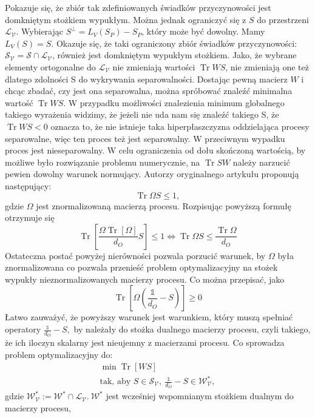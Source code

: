 \documentclass[10pt]{article} %
\DeclareMathOperator{\Trs}{Tr}
\newcommand{\I}{\mathbb{1}}
\begin{document}
Pokazuje się, że zbiór tak zdefiniowanych świadków przyczynowości jest domkniętym stożkiem wypukłym. Można jednak ograniczyć się z $S$ do przestrzeni 
$\mathcal{L_V}$. Wybierając $S^\bot = L_V(S_P) - S_P$, który może być dowolny. Mamy $L_V(S) = S$. Okazuje się, że taki ograniczony zbiór świadków przyczynowości: $\mathcal{S_V} = \mathcal{S} \cap \mathcal{L_V}$, również jest domkniętym wypukłym stożkiem. Jako, że wybrane elementy ortogonalne do
$\mathcal{L_V}$ nie zmieniają wartości $\Trs WS$, nie zmieniają one też dlatego zdolności S do wykrywania separowalności. 
Dostając pewną macierz $W$ i chcąc zbadać, czy jest ona separowalna, można spróbować znaleźć minimalna wartość $\Trs WS$. W przypadku możliwości 
znalezienia minimum globalnego takiego wyrażenia widzimy, że jeżeli nie uda nam się znaleźć takiego S, że $\Trs WS < 0$ oznacza to, że nie istnieje
taka hiperpłaszczyzna oddzielająca procesy separowalne, więc ten proces też jest separowalny. W przeciwnym wypadku proces jest nieseparowalny.
W celu ograniczenia od dołu skończoną wartością, by możliwe było rozwiązanie problemu numerycznie, na $\Trs SW$ należy narzucić pewien dowolny warunek normujący.
Autorzy oryginalnego artykułu proponują następujący:
\begin{equation}
\Trs \Omega S \leq 1,
\end{equation}
gdzie $\Omega$ jest znormalizowaną macierzą procesu.
Rozpisując powyższą formułę otrzymuje się
\begin{equation}
\Trs\left[ \frac{\Omega \Trs \left[ \Omega \right]}{d_O}S\right]\leq1 \iff \Trs \Omega S \leq \frac{\Trs \Omega}{d_O}
\end{equation}
Ostateczna postać powyżej nierówności pozwala porzucić warunek, by $\Omega$ była znormalizowana co pozwala przenieść problem optymalizacyjny na stożek wypukły nieznormalizowanych macierzy procesu.
Co można przepisać, jako 
\begin{equation}
\Trs \left[ \Omega(\frac{\I}{d_O} -S) \right] \geq 0
\end{equation}
Łatwo zauważyć, że powyższy warunek jest warunkiem, który muszą spełniać operatory $\frac{\I}{d_O} - S,$ by należały do stożka dualnego macierzy procesu, czyli takiego, że ich iloczyn skalarny jest nieujemny z macierzami procesu. Co sprowadza problem optymalizacyjny do:
\begin{gather}
\min \Trs \left[ WS \right]\\
\text{tak, aby } S \in \mathcal{S_V},~ \frac{\I}{d_O} - S \in \mathcal{W^*_V},
\end{gather}
gdzie $\mathcal{W^*_V}:=\mathcal{W^*} \cap \mathcal{L_V}.~ \mathcal{W^*}$ jest wcześniej wspomnianym stożkiem dualnym do macierzy procesu,
\end{document}
